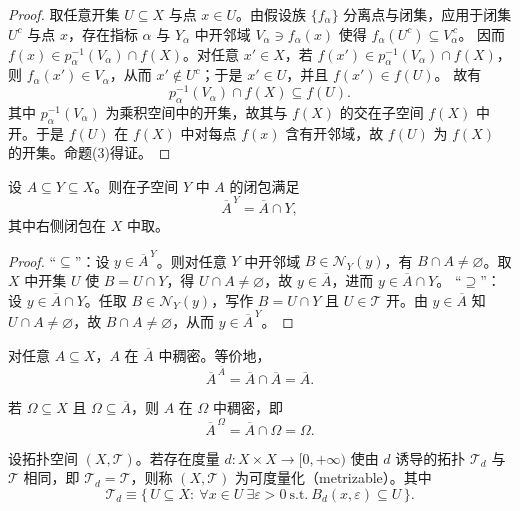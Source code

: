 \documentclass[lang=cn,a4paper,newtx,figureplace=section,tableplace=section]{elegantbook}
\begin{document}
 \begin{proof}
  取任意开集 $U\subseteq X$ 与点 $x\in U$。由假设族 $\{f_\alpha\}$ 分离点与闭集，应用于闭集 $U^c$ 与点 $x$，存在指标 $\alpha$ 与 $Y_\alpha$ 中开邻域 $V_\alpha\ni f_\alpha(x)$ 使得 $f_\alpha(U^c)\subseteq V_\alpha^{\,c}$。
  因而 $f(x)\in p_\alpha^{-1}(V_\alpha)\cap f(X)$。对任意 $x'\in X$，若 $f(x')\in p_\alpha^{-1}(V_\alpha)\cap f(X)$，则 $f_\alpha(x')\in V_\alpha$，从而 $x'\notin U^c$；于是 $x'\in U$，并且 $f(x')\in f(U)$。
  故有
  \[
   p_\alpha^{-1}(V_\alpha)\cap f(X)\subseteq f(U).
  \]
  其中 $p_\alpha^{-1}(V_\alpha)$ 为乘积空间中的开集，故其与 $f(X)$ 的交在子空间 $f(X)$ 中开。于是 $f(U)$ 在 $f(X)$ 中对每点 $f(x)$ 含有开邻域，故 $f(U)$ 为 $f(X)$ 的开集。命题(3)得证。
 \end{proof}

 \begin{proposition}[子空间中的闭包]\label{prop:closure-in-subspace}
  设 $A\subseteq Y\subseteq X$。则在子空间 $Y$ 中 $A$ 的闭包满足
  \[
   \overline{A}^{\,Y}=\overline{A}\cap Y,
  \]
  其中右侧闭包在 $X$ 中取。
 \end{proposition}
 \begin{proof}
  “$\subseteq$”：设 $y\in\overline{A}^{\,Y}$。则对任意 $Y$ 中开邻域 $B\in\mathcal N_Y(y)$，有 $B\cap A\neq\varnothing$。取 $X$ 中开集 $U$ 使 $B=U\cap Y$，得 $U\cap A\neq\varnothing$，故 $y\in\overline{A}$，进而 $y\in\overline{A}\cap Y$。
  “$\supseteq$”：设 $y\in\overline{A}\cap Y$。任取 $B\in\mathcal N_Y(y)$，写作 $B=U\cap Y$ 且 $U\in\mathcal T$ 开。由 $y\in\overline{A}$ 知 $U\cap A\neq\varnothing$，故 $B\cap A\neq\varnothing$，从而 $y\in\overline{A}^{\,Y}$。
 \end{proof}
 
 \begin{corollary}\label{cor:dense-in-closure}
  对任意 $A\subseteq X$，$A$ 在 $\overline{A}$ 中稠密。等价地，
  \[
   \overline{A}^{\,\overline{A}}=\overline{A}\cap\overline{A}=\overline{A}.
  \]
 \end{corollary}
 
 \begin{corollary}\label{cor:dense-in-omega}
  若 $\Omega\subseteq X$ 且 $\Omega\subseteq\overline{A}$，则 $A$ 在 $\Omega$ 中稠密，即
  \[
   \overline{A}^{\,\Omega}=\overline{A}\cap\Omega=\Omega.
  \]
 \end{corollary}

 \begin{definition}[可度量化空间]\label{def:metrizable-space-2}
  设拓扑空间 $(X,\mathcal T)$。若存在度量 $d:X\times X\to[0,+\infty)$ 使由 $d$ 诱导的拓扑 $\mathcal T_d$ 与 $\mathcal T$ 相同，即 $\mathcal T_d=\mathcal T$，则称 $(X,\mathcal T)$ 为可度量化（metrizable）。其中
  \[
   \mathcal T_d \equiv \{\,U\subseteq X:\ \forall x\in U\ \exists \varepsilon>0\ \text{s.t.}\ B_d(x,\varepsilon)\subseteq U\,\}.
  \]
 \end{definition}
\end{document}
